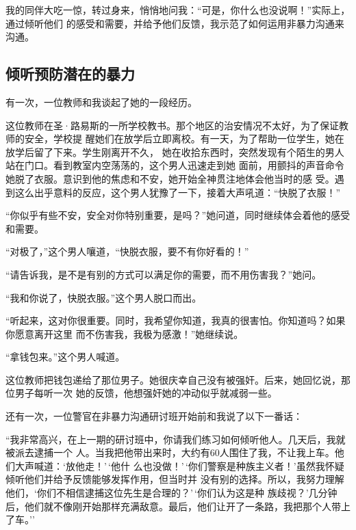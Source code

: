 \documentclass{ctexart}
\renewenvironment{quotation}{\setlength{\parskip}{0.5em}\setstretch{1.5}\kaishu\zihao{-5}\setlength{\parindent}{1em}}{\vspace{1em}}
\begin{document}
我的同伴大吃一惊，转过身来，悄悄地问我：``可是，你什么也没说啊！''实际上，通过倾听他们
的感受和需要，并给予他们反馈，我示范了如何运用非暴力沟通来沟通。


\subsection{倾听预防潜在的暴力}

有一次，一位教师和我谈起了她的一段经历。

这位教师在圣·路易斯的一所学校教书。那个地区的治安情况不太好，为了保证教师的安全，学校提
醒她们在放学后立即离校。有一天，为了帮助一位学生，她在放学后留了下来。学生刚离开不久，
她在收拾东西时，突然发现有个陌生的男人站在门口。看到教室内空荡荡的，这个男人迅速走到她
面前，用颤抖的声音命令她脱了衣服。意识到他的焦虑和不安，她开始全神贯注地体会他当时的感
受。遇到这么出乎意料的反应，这个男人犹豫了一下，接着大声吼道：``快脱了衣服！''

\begin{quotation}
	``你似乎有些不安，安全对你特别重要，是吗？''她问道，同时继续体会着他的感受和需要。

	``对极了，''这个男人嚷道，``快脱衣服，要不有你好看的！''

	``请告诉我，是不是有别的方式可以满足你的需要，而不用伤害我？''她问。

	``我和你说了，快脱衣服。''这个男人脱口而出。

	``听起来，这对你很重要。同时，我希望你知道，我真的很害怕。你知道吗？如果你愿意离开这里
	而不伤害我，我极为感激！''她继续说。

	``拿钱包来。''这个男人喊道。
\end{quotation}


这位教师把钱包递给了那位男子。她很庆幸自己没有被强奸。后来，她回忆说，那位男子每听一次
她的反馈，他想强奸她的冲动似乎就减弱一些。

还有一次，一位警官在非暴力沟通研讨班开始前和我说了以下一番话：

\begin{quotation}
	``我非常高兴，在上一期的研讨班中，你请我们练习如何倾听他人。几天后，我就被派去逮捕一个
	人。当我把他带出来时，大约有60人围住了我，不让我上车。他们大声喊道：`放他走！'\,`他什
	么也没做！'\,`你们警察是种族主义者！'虽然我怀疑倾听他们并给予反馈能够发挥作用，但当时并
	没有别的选择。所以，我努力理解他们，`你们不相信逮捕这位先生是合理的？'\,`你们认为这是种
	族歧视？'几分钟后，他们就不像刚开始那样充满敌意。最后，他们让开了一条路，我把那个人带上
	了车。''
\end{quotation}
\end{document}
